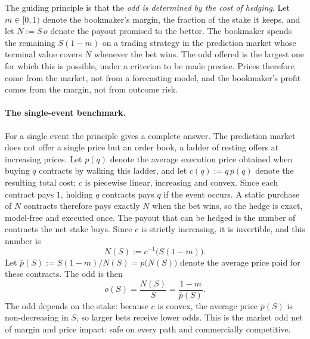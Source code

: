 \documentclass[11pt,a4paper]{article}
\theoremstyle{plain}
\theoremstyle{definition}
\theoremstyle{remark}
\newcommand{\1}{\mathbf{1}}
\begin{document}
The guiding principle is that the \emph{odd is determined by the cost of hedging}. Let $m\in[0,1)$ denote the bookmaker's margin, the fraction of the stake it keeps, and let $N := S\,o$ denote the payout promised to the bettor. The bookmaker spends the remaining $S(1-m)$ on a trading strategy in the prediction market whose terminal value covers $N$ whenever the bet wins. The odd offered is the largest one for which this is possible, under a criterion to be made precise. Prices therefore come from the market, not from a forecasting model, and the bookmaker's profit comes from the margin, not from outcome risk.

\paragraph{The single-event benchmark.}
For a single event the principle gives a complete answer. The prediction market does not offer a single price but an order book, a ladder of resting offers at increasing prices. Let $p(q)$ denote the average execution price obtained when buying $q$ contracts by walking this ladder, and let $c(q) := q\,p(q)$ denote the resulting total cost; $c$ is piecewise linear, increasing and convex. Since each contract pays $1$, holding $q$ contracts pays $q$ if the event occurs. A static purchase of $N$ contracts therefore pays exactly $N$ when the bet wins, so the hedge is exact, model-free and executed once. The payout that can be hedged is the number of contracts the net stake buys. Since $c$ is strictly increasing, it is invertible, and this number is
\[
N(S) := c^{-1}\bigl(S(1-m)\bigr).
\]
Let $\bar p(S) := S(1-m)/N(S) = p\bigl(N(S)\bigr)$ denote the average price paid for these contracts. The odd is then
\[
o(S) = \frac{N(S)}{S} = \frac{1-m}{\bar p(S)}.
\]
The odd depends on the stake: because $c$ is convex, the average price $\bar p(S)$ is non-decreasing in $S$, so larger bets receive lower odds. This is the market odd net of margin and price impact: safe on every path and commercially competitive.
\end{document}
